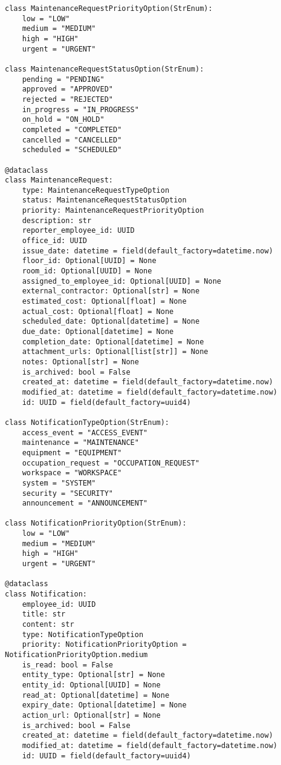 \begin{lstlisting}[style=pythonstyle]
class MaintenanceRequestPriorityOption(StrEnum):
    low = "LOW"
    medium = "MEDIUM"
    high = "HIGH"
    urgent = "URGENT"

class MaintenanceRequestStatusOption(StrEnum):
    pending = "PENDING"
    approved = "APPROVED"
    rejected = "REJECTED"
    in_progress = "IN_PROGRESS"
    on_hold = "ON_HOLD"
    completed = "COMPLETED"
    cancelled = "CANCELLED"
    scheduled = "SCHEDULED"

@dataclass
class MaintenanceRequest:
    type: MaintenanceRequestTypeOption
    status: MaintenanceRequestStatusOption
    priority: MaintenanceRequestPriorityOption
    description: str
    reporter_employee_id: UUID
    office_id: UUID
    issue_date: datetime = field(default_factory=datetime.now)
    floor_id: Optional[UUID] = None
    room_id: Optional[UUID] = None
    assigned_to_employee_id: Optional[UUID] = None
    external_contractor: Optional[str] = None
    estimated_cost: Optional[float] = None
    actual_cost: Optional[float] = None
    scheduled_date: Optional[datetime] = None
    due_date: Optional[datetime] = None
    completion_date: Optional[datetime] = None
    attachment_urls: Optional[list[str]] = None
    notes: Optional[str] = None
    is_archived: bool = False
    created_at: datetime = field(default_factory=datetime.now)
    modified_at: datetime = field(default_factory=datetime.now)
    id: UUID = field(default_factory=uuid4)

class NotificationTypeOption(StrEnum):
    access_event = "ACCESS_EVENT"
    maintenance = "MAINTENANCE"
    equipment = "EQUIPMENT"
    occupation_request = "OCCUPATION_REQUEST"
    workspace = "WORKSPACE"
    system = "SYSTEM"
    security = "SECURITY"
    announcement = "ANNOUNCEMENT"

class NotificationPriorityOption(StrEnum):
    low = "LOW"
    medium = "MEDIUM"
    high = "HIGH"
    urgent = "URGENT"

@dataclass
class Notification:
    employee_id: UUID
    title: str
    content: str
    type: NotificationTypeOption
    priority: NotificationPriorityOption = NotificationPriorityOption.medium
    is_read: bool = False
    entity_type: Optional[str] = None
    entity_id: Optional[UUID] = None
    read_at: Optional[datetime] = None
    expiry_date: Optional[datetime] = None
    action_url: Optional[str] = None
    is_archived: bool = False
    created_at: datetime = field(default_factory=datetime.now)
    modified_at: datetime = field(default_factory=datetime.now)
    id: UUID = field(default_factory=uuid4)


\end{lstlisting}

